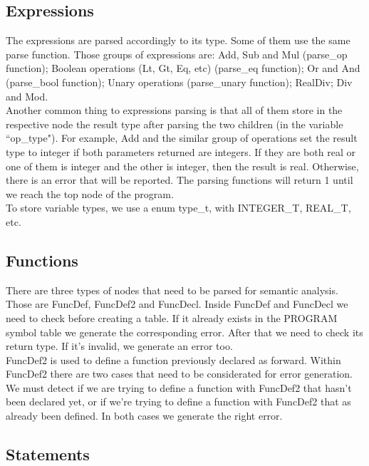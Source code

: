 \documentclass[12pt]{article}
\begin{document}
\subsection{Expressions}

The expressions are parsed accordingly to its type. Some of them use the same parse function. Those groups of expressions are: Add, Sub and Mul (parse\_op function); Boolean operations (Lt, Gt, Eq, etc) (parse\_eq function); Or and And (parse\_bool function); Unary operations (parse\_unary function); RealDiv; Div and Mod.\\
Another common thing to expressions parsing is that all of them store in the respective node the result type after parsing the two children (in the variable ``op\_type"). For example, Add and the similar group of operations set the result type to integer if both parameters returned are integers. If they are both real or one of them is integer and the other is integer, then the result is real. Otherwise, there is an error that will be reported. The parsing functions will return 1 until we reach the top node of the program.\\
To store variable types, we use a enum type\_t, with INTEGER\_T, REAL\_T, etc.\\

\subsection{Functions}
There are three types of nodes that need to be parsed for semantic analysis. Those are FuncDef, FuncDef2 and FuncDecl. Inside FuncDef and FuncDecl we need to check before creating a table. If it already exists in the PROGRAM symbol table we generate the corresponding error. After that we need to check its return type. If it's invalid, we generate an error too. \\
FuncDef2 is used to define a function previously declared as forward. Within FuncDef2 there are two cases that need to be considerated for error generation. We must detect if we are trying to define a function with FuncDef2 that hasn't been declared yet, or if we're trying to define a function with FuncDef2 that as already been defined. In both cases we generate the right error.

\subsection{Statements}
\end{document}
